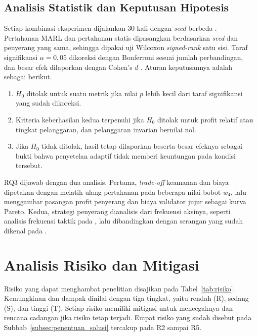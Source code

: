 \subsection{Analisis Statistik dan Keputusan Hipotesis}
\label{subsec:analisis_statistik}
Setiap kombinasi eksperimen dijalankan 30 kali dengan \textit{seed} berbeda \parencite{skowronski2026adaptive}. Pertahanan MARL dan pertahanan statis dipasangkan berdasarkan \textit{seed} dan penyerang yang sama, sehingga dipakai uji Wilcoxon \textit{signed-rank} satu sisi. Taraf signifikansi $\alpha = 0{,}05$ dikoreksi dengan Bonferroni sesuai jumlah perbandingan, dan besar efek dilaporkan dengan Cohen's $d$ \parencite{wushishi2026coadam}. Aturan keputusannya adalah sebagai berikut.
\begin{enumerate}
	\item $H_0$ ditolak untuk suatu metrik jika nilai $p$ lebih kecil dari taraf signifikansi yang sudah dikoreksi.
	\item Kriteria keberhasilan kedua terpenuhi jika $H_0$ ditolak untuk profit relatif atau tingkat pelanggaran, dan pelanggaran invarian bernilai nol.
	\item Jika $H_0$ tidak ditolak, hasil tetap dilaporkan beserta besar efeknya sebagai bukti bahwa penyetelan adaptif tidak memberi keuntungan pada kondisi tersebut.
\end{enumerate}

RQ3 dijawab dengan dua analisis. Pertama, \textit{trade-off} keamanan dan biaya dipetakan dengan melatih ulang pertahanan pada beberapa nilai bobot $w_4$, lalu menggambar pasangan profit penyerang dan biaya validator jujur sebagai kurva Pareto. Kedua, strategi penyerang dianalisis dari frekuensi aksinya, seperti analisis frekuensi taktik pada \textcite{wushishi2026coadam}, lalu dibandingkan dengan serangan yang sudah dikenal pada \textcite{laneve2025stochastic}.

\section{Analisis Risiko dan Mitigasi}
\label{sec:risiko}
Risiko yang dapat menghambat penelitian disajikan pada Tabel~\ref{tab:risiko}. Kemungkinan dan dampak dinilai dengan tiga tingkat, yaitu rendah (R), sedang (S), dan tinggi (T). Setiap risiko memiliki mitigasi untuk mencegahnya dan rencana cadangan jika risiko tetap terjadi. Empat risiko yang sudah disebut pada Subbab~\ref{subsec:penentuan_solusi} tercakup pada R2 sampai R5.

